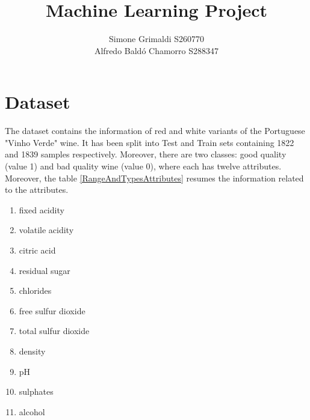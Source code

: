 \documentclass[twoside,a4paper,12pt]{report}
\title{Machine Learning Project}
\author{
    Simone Grimaldi S260770 \\
Alfredo Baldó Chamorro     S288347\\}
\begin{document}
\maketitle
\tableofcontents

\newpage
\newpage


\setcounter{chapter}{1}


\section{Dataset}

The dataset contains the information of red and white variants of the Portuguese "Vinho Verde" wine. 
It has been split into Test and Train sets containing 1822 and 1839 samples respectively. 
Moreover, there are two classes: good quality (value 1) and bad quality wine (value 0), 
where each has twelve attributes. Moreover, the table \ref{RangeAndTypesAttributes} 
resumes the information related to the attributes.

\begin{enumerate}
    \item fixed acidity
    \item volatile acidity
    \item citric acid
    \item residual sugar
    \item chlorides
    \item free sulfur dioxide
    \item total sulfur dioxide
    \item density
    \item pH
    \item sulphates
    \item alcohol
\end{enumerate}
\end{document}
